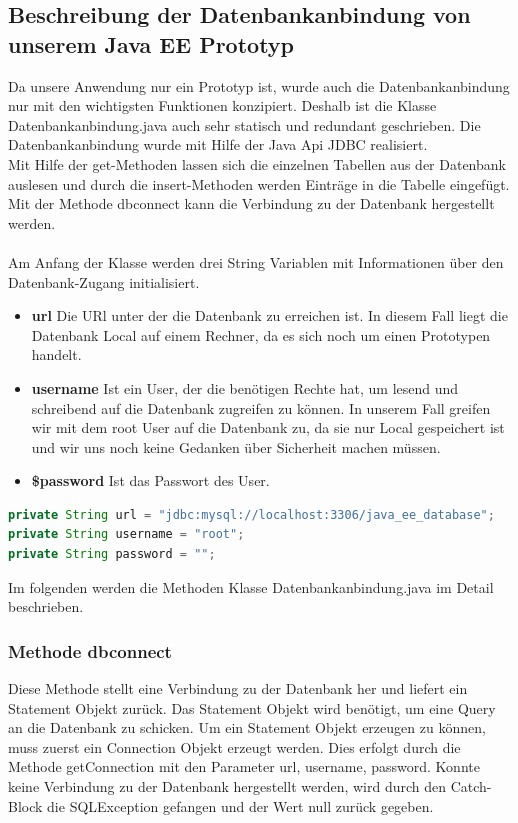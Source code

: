 \newpage

\subsection{Beschreibung der Datenbankanbindung von unserem Java EE Prototyp}

Da unsere Anwendung nur ein Prototyp ist, wurde auch die Datenbankanbindung nur mit den wichtigsten Funktionen konzipiert. Deshalb ist die Klasse Datenbankanbindung.java auch sehr statisch und redundant geschrieben. 
Die Datenbankanbindung wurde mit Hilfe der Java Api JDBC realisiert.\\
Mit Hilfe der get-Methoden lassen sich die einzelnen Tabellen aus der Datenbank auslesen und durch die insert-Methoden werden Einträge in die Tabelle eingefügt.
Mit der Methode dbconnect kann die Verbindung zu der Datenbank hergestellt werden.\\
\\
Am Anfang der Klasse werden drei String Variablen mit Informationen über den Datenbank-Zugang initialisiert.
\begin{itemize}
	\item \textbf{url} Die URl unter der die Datenbank zu erreichen ist. In diesem Fall liegt die Datenbank Local auf einem Rechner, da es sich noch um einen Prototypen handelt.
	\item \textbf{username} Ist ein User, der die benötigen Rechte hat, um lesend und schreibend auf die Datenbank zugreifen zu können. In unserem Fall greifen wir mit dem root User auf die Datenbank zu, da sie nur Local gespeichert ist und wir uns noch keine Gedanken über Sicherheit machen müssen.
	\item \textbf{\$password} Ist das Passwort des User. 
\end{itemize}

\begin{lstlisting}[language=JAVA, caption=Datenbankanbindung.java/Datenfelder, firstnumber=30]
private String url = "jdbc:mysql://localhost:3306/java_ee_database";
private String username = "root";
private String password = "";
\end{lstlisting}
\newpage
Im folgenden werden die Methoden Klasse Datenbankanbindung.java im Detail beschrieben.
 
\subsubsection{Methode dbconnect\(\)}
Diese Methode stellt eine Verbindung zu der Datenbank her und liefert ein Statement Objekt zurück. Das Statement Objekt wird benötigt, um eine Query an die Datenbank zu schicken.
Um ein Statement Objekt erzeugen zu können, muss zuerst ein Connection Objekt erzeugt werden. Dies erfolgt durch die Methode getConnection mit den Parameter url, username, password. Konnte keine Verbindung zu der Datenbank hergestellt werden, wird durch den Catch-Block die SQLException gefangen und der Wert null zurück gegeben.

